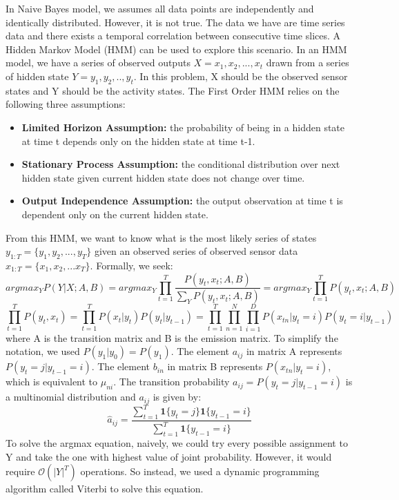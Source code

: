 \documentclass[10pt,letter]{article}
\numberwithin{equation}{section} %
\numberwithin{figure}{section} %
\numberwithin{table}{section} %
\begin{document}
In Naive Bayes model, we assumes all data points are independently and identically distributed. However, it is not true. The data we have are time series data and there exists a temporal correlation between consecutive time slices. A Hidden Markov Model (HMM) can be used to explore this scenario. In an HMM model, we have a series of observed outputs $X={x_1, x_2, ...,x_t}$ drawn from a series of hidden state $Y={y_1, y_2, ..,y_t}$. In this problem, X should be the observed sensor states and Y should be the activity states. The First Order HMM relies on the following three assumptions:
\begin{itemize}
\item \textbf{Limited Horizon Assumption:} the probability of being in a hidden state at time t depends only on the hidden state at time t-1.
\item \textbf{Stationary Process Assumption:} the conditional distribution over next hidden state given current hidden state does not change over time. 
\item \textbf{Output Independence Assumption:} the output observation at time t is dependent
only on the current hidden state.
\end{itemize}
From this HMM, we want to know what is the most likely series of states  $y_{1:T} = \{y_1,y_2,...,y_T\}$ given an observed series of observed sensor data $x_{1:T} = \{x_1,x_2,...x_T\}$. Formally, we seek:
$$arg max_{Y} P(Y|X; A, B) = arg max_{Y} \prod_{t=1}^{T} \frac{P(y_t, x_t; A, B)}{\sum_{Y} P(y_t,x_t; A,B)}= arg max_{Y} \prod_{t=1}^{T} P(y_t, x_t; A, B)$$
$$ \prod_{t=1}^{T} P(y_t, x_t) = \prod_{t=1}^T P(x_t|y_t)P(y_t|y_{t-1})=\prod_{t=1}^T\prod_{n=1}^N\prod_{i=1}^D P(x_{tn}|y_t = i)P(y_t=i|y_{t-1})$$
where A is the transition matrix and B is the emission matrix. To simplify the notation, we used $P(y_1|y_0)=P(y_1)$. The element $a_{ij}$ in matrix A represents $P(y_t=j|y_{t-1}=i)$. The element $b_{in}$ in matrix B represents $P(x_{tn}|y_t=i)$, which is equivalent to $\mu_{ni}$.  The transition probability $a_{ij}=P(y_t=j|y_{t-1}=i)$ is a multinomial distribution and $a_{ij}$ is given by:
$$\hat{a}_{ij} = \frac{\sum_{t=1}^T \mathbf{1}\{y_t=j\}\mathbf{1}\{y_{t-1}=i\}}{\sum_{t=1}^T \mathbf{1}\{y_{t-1}=i\}}$$
To solve the argmax equation, naively, we could try every possible assignment to Y and take the one with highest value of joint probability. However, it would require $\mathcal{O}(|Y|^T)$ operations. So instead, we used a dynamic programming algorithm called Viterbi to solve this equation. 
\end{document}

